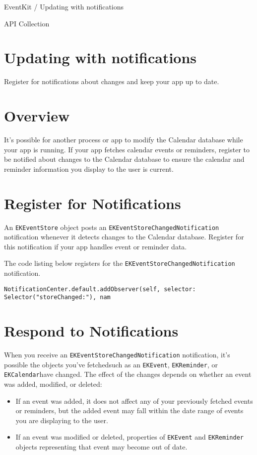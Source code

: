 \documentclass{article}
\title{}
\author{}
\date{}
\begin{document}
EventKit / Updating with notifications

API Collection

\section*{Updating with notifications}
Register for notifications about changes and keep your app up to date.

\section*{Overview}
It's possible for another process or app to modify the Calendar database while your app is running. If your app
fetches calendar events or reminders, register to be notified about changes to the Calendar database to ensure
the calendar and reminder information you display to the user is current.

\section*{Register for Notifications}
An \texttt{EKEventStore} object posts an \texttt{EKEventStoreChangedNotification} notification whenever it detects
changes to the Calendar database. Register for this notification if your app handles event or reminder data.

The code listing below registers for the \texttt{EKEventStoreChangedNotification} notification.

\noindent\texttt{NotificationCenter.default.addObserver(self, selector: Selector("storeChanged:"), nam}

\section*{Respond to Notifications}
When you receive an \texttt{EKEventStoreChangedNotification} notification, it's possible the objects you've
fetched\textemdash such as an \texttt{EKEvent}, \texttt{EKReminder}, or \texttt{EKCalendar}\textemdash have changed. The effect of the changes
depends on whether an event was added, modified, or deleted:

\begin{itemize}
    \item If an event was added, it does not affect any of your previously fetched events or reminders, but the added
event may fall within the date range of events you are displaying to the user.
    \item If an event was modified or deleted, properties of \texttt{EKEvent} and \texttt{EKReminder} objects representing that event
may become out of date.
\end{itemize}
\end{document}
